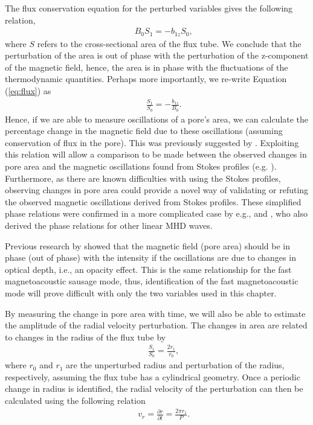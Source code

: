     The flux conservation equation for the perturbed variables gives the following relation,
    \begin{align}
        &&B_0S_1=-b_{1z}S_0,
        \label{eq:flux}
    \end{align}
    where $S$ refers to the cross-sectional area of the flux tube.
    We conclude that the perturbation of the area is out of phase with the perturbation of the  z-component of the magnetic field, hence, the area is in phase with the fluctuations of the thermodynamic quantities.
    Perhaps more importantly, we re-write Equation (\ref{eq:flux}) as
    \begin{align}
        &&\frac{S_1}{S_0}=-\frac{b_{1z}}{B_0}.
        \label{eq:mag_area}
    \end{align}
    Hence, if we are able to measure oscillations of a pore's area, we can calculate the percentage change in the magnetic field due to these oscillations (assuming conservation of flux in the pore).
    This was previously suggested by \cite{0004-637X-806-1-132}.
    Exploiting this relation will allow a comparison to be made between the observed changes in pore area and the magnetic oscillations found from Stokes profiles (e.g. \citealp{Balthasar2000}).
    Furthermore, as there are known difficulties with using the Stokes profiles, observing changes in pore area could provide a novel way of validating or refuting the observed magnetic oscillations derived from Stokes profiles.
    These simplified phase relations were confirmed in a more complicated case by e.g., \cite{Moreels2013} and \cite{Moreels2013b}, who also derived the phase relations for other linear MHD waves. 

    Previous research by \cite{PMHDW} showed that the magnetic field (pore area) should be in phase (out of phase) with the intensity if the oscillations are due to changes in optical depth, i.e., an opacity effect.
    This is the same relationship for the fast magnetoacoustic sausage mode, thus, identification of the fast magnetoacoustic mode will prove difficult with only the two variables used in this chapter.
    
    By measuring the change in pore area with time, we will also be able to estimate the amplitude of the radial velocity perturbation.
    The changes in area are related to changes in the radius of the flux tube by
    \begin{align}
        &&\frac{S_1}{S_0}=\frac{2r_1}{r_0},
        \label{eq:area_rad}
    \end{align}
    where $r_0$ and $r_1$ are the unperturbed radius and perturbation of the radius, respectively, assuming the flux tube has a cylindrical geometry.
    Once a periodic change in radius is identified, the radial velocity of the perturbation can then be calculated using the following relation
    \begin{align}
        &&v_r=\frac{\partial r}{\partial t}=\frac{2\pi r_1}{P}.
        \label{eq:rad_vel}
    \end{align}
    
